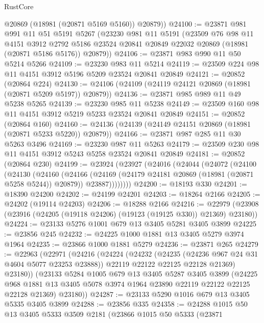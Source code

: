 \begin{lexlean}{RustCore}
\begin{coremodule}
        @20869
        (@18981 (@20871 @5169 @5160))
        @20879))
@24100 := @23871
    @981
    @991
    @11
    @51
    @5191
    @5267
    (@23230
      @981
      @11
      @5191
      (@23509
        @76
        @98
        @11
        @4151
        @3912
        @2792
        @5186
        @23524
        @20841
        @20849
        @22032
        @20869
        (@18981 (@20871 @5186 @5176))
        @20879))
@24106 := @23871 @983 @990 @11 @50 @5214 @5266
@24109 := @23230 @983 @11 @5214
@24119 := @23509 @224 @98 @11 @4151 @3912 @5196 @5209 @23524 @20841 @20849
@24121 := @20852 (@20864 @224)
@24130 := @24106 (@24109 (@24119 @24121 @20869 (@18981 (@20871 @5209 @5197)) @20879))
@24136 := @23871 @985 @989 @11 @49 @5238 @5265
@24139 := @23230 @985 @11 @5238
@24149 := @23509 @160 @98 @11 @4151 @3912 @5219 @5233 @23524 @20841 @20849
@24151 := @20852 (@20864 @160)
@24160 := @24136 (@24139 (@24149 @24151 @20869 (@18981 (@20871 @5233 @5220)) @20879))
@24166 := @23871 @987 @285 @11 @30 @5263 @3496
@24169 := @23230 @987 @11 @5263
@24179 := @23509 @230 @98 @11 @4151 @3912 @5243 @5258 @23524 @20841 @20849
@24181 := @20852 (@20864 @230)
@24199 := @23924
    (@23927
      (@24016
        (@24044
          (@24072
            (@24100
              (@24130
                (@24160
                  (@24166
                    (@24169 (@24179 @24181 @20869 (@18981 (@20871 @5258 @5244)) @20879))
                    @23887))))))))
@24200 := @18193 @330
@24201 := @18390 @24200
@24202 := @24199 @24201
@24203 := @18264 @2166
@24205 := @24202 (@19114 @24203)
@24206 := @18288 @2166
@24216 := @22979 (@23908 (@23916 (@24205 (@19118 @24206) (@19123 (@19125 @330)) @21369) @23180))
@24224 := @23133 @5276 @1001 @679 @13 @3405 @5281 @3405 @3899
@24225 := @23856 @245
@24232 := @24225 @1000 @1881 @13 @3405 @5279 @3974 @1964
@24235 := @23866 @1000 @1881 @5279
@24236 := @23871 @265
@24279 := @22963
    (@22971
      (@24216
        (@24224
          (@24232
            (@24235 (@24236 @967 @24 @31 @4604 @5077 @23253 @23888))
            @22119
            @22122
            @22125
            @22128
            @21369)
          @23180))
      (@23133
        @5284
        @1005
        @679
        @13
        @3405
        @5287
        @3405
        @3899
        (@24225 @968 @1881 @13 @3405 @5078 @3974 @1964 @23890 @22119 @22122 @22125 @22128 @21369)
        @23180))
@24287 := @23133 @5290 @1016 @679 @13 @3405 @5335 @3405 @3899
@24288 := @23856 @335
@24358 := @24288
    @1015
    @50
    @13
    @3405
    @5333
    @3509
    @2181
    (@23866
      @1015
      @50
      @5333
      (@23871

\end{coremodule}
\end{lexlean}
